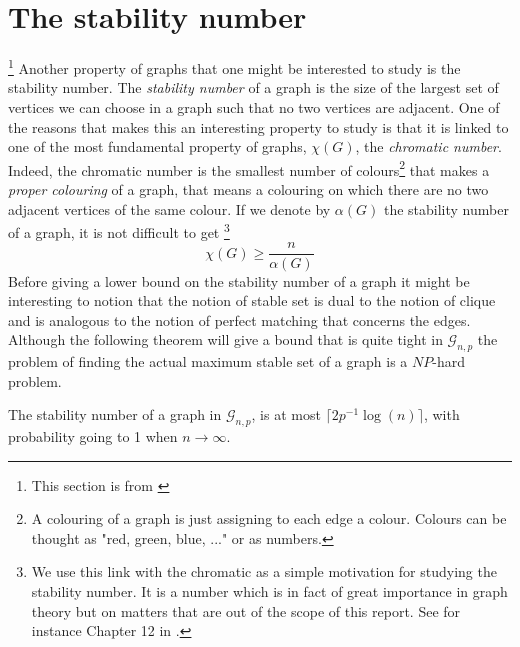 \section{The stability number}\footnote{This section is from \cite{Bondy08}}
Another property of graphs that one might be interested to study is the stability number. The \emph{stability number} of a graph is the size of the largest set of vertices we can choose in a graph such that no two vertices are adjacent. 
One of the reasons that makes this an interesting property to study is that it is linked to one of the most fundamental property of graphs, $\chi (G)$, the \emph{chromatic number}. 
Indeed, the chromatic number is the smallest number of colours\footnote{A colouring of a graph is just assigning to each edge a colour. Colours can be thought as "red, green, blue, ..." or as numbers.} that makes a \emph{proper colouring} of a graph, 
that means a colouring on which there are no two adjacent vertices of the same colour. 
If we denote by $\alpha(G)$ the stability number of a graph, it is not difficult to get \footnote{ We use this link with the chromatic as a simple motivation for studying the stability number. It is a number which is in fact of great importance in graph theory but on matters that are out of the scope of this report. See for instance Chapter 12 in \cite{Bondy08}.}
\begin{equation}
	\chi(G) \geq \frac{n}{\alpha(G)}
\end{equation}
Before giving a lower bound on the stability number of a graph it might be interesting to notion that the notion of stable set is dual to the notion of clique and is analogous to the notion of perfect matching that concerns the edges.
Although the following theorem will give a bound that is quite tight in $\mathcal{G}_{n, p}$ the problem of finding the actual maximum stable set of a graph is a $NP$-hard problem.
\begin{theorem}
	The stability number of a graph in $\mathcal{G}_{n, p}$, is at most $\lceil 2p^{-1}\log(n)\rceil$, with probability going to 1 when $n \longrightarrow \infty$.
\end{theorem}
